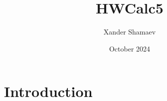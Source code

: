 \documentclass{article}
\title{HWCalc5}
\author{Xander Shamaev}
\date{October 2024}
\begin{document}
\maketitle

\section{Introduction}
\end{document}

